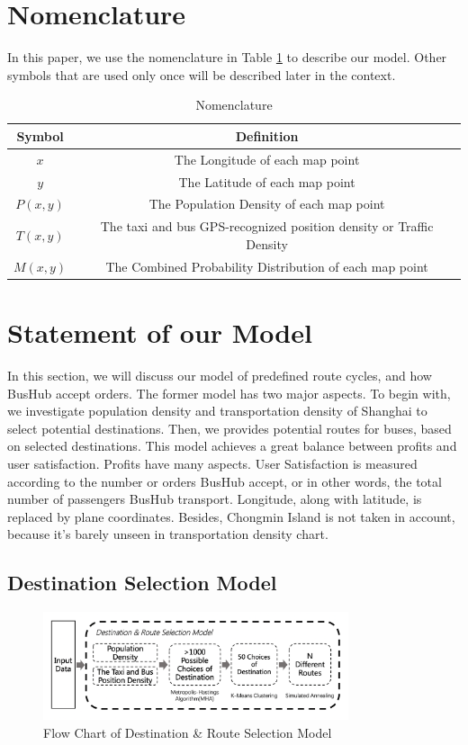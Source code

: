 \documentclass{mcmthesis}
\begin{document}
\section{Nomenclature}\label{sec:Nome}
In this paper, we use the nomenclature in Table \ref{tab:Nomen} to describe our model. Other symbols that are used only once will be described later in the context.
\begin{table}
    \centering
    \caption{Nomenclature}
    \label{tab:Nomen}
    \begin{tabular}{c c}
\hline
    	Symbol & Definition\\
\hline
	$x$ & The Longitude of each map point\\
	$y$ & The Latitude of each map point\\
	$P(x,y)$ & The Population Density of each map point\\
	$T(x,y)$ & The taxi and bus GPS-recognized position density or Traffic Density\\
	$M(x,y)$ & The Combined Probability Distribution of each map point\\
\hline
    \end{tabular}
\end{table}

\section{Statement of our Model}\label{sec:stat}

In this section, we will discuss our model of predefined route cycles, and how BusHub accept orders. The former model has two major aspects. To begin with, we investigate population density and transportation density of Shanghai to select potential destinations. Then, we provides potential routes for buses, based on selected destinations. This model achieves a great balance between profits and user satisfaction. Profits have many aspects. User Satisfaction is measured according to the number or orders BusHub accept, or in other words, the total number of passengers BusHub transport. Longitude, along with latitude, is replaced by plane coordinates. Besides, Chongmin Island is not taken in account, because it's barely unseen in transportation density chart.

\subsection{Destination Selection Model}

\begin{figure}[h]
    \centering
    \includegraphics[width=0.8\textwidth]{figures/flowchart.png}
    \caption{Flow Chart of Destination \& Route Selection Model}
    \label{fig:flowchart}
\end{figure}
\end{document}
